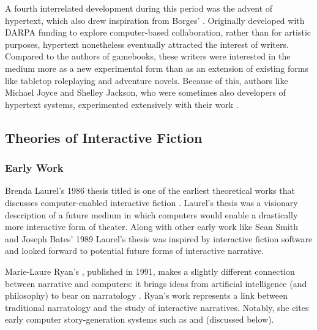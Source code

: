 A fourth interrelated development during this period was the advent of hypertext, which also drew inspiration from Borges' .
%
Originally developed with DARPA funding to explore computer-based collaboration, rather than for artistic purposes, hypertext nonetheless eventually attracted the interest of writers.
%
Compared to the authors of gamebooks, these writers were interested in the medium more as a new experimental form than as an extension of existing forms like tabletop roleplaying and adventure novels.
%
Because of this, authors like Michael Joyce and Shelley Jackson, who were sometimes also developers of hypertext systems, experimented extensively with their work \citep{Joyce1990, Jackson1995}.


\subsection{Theories of Interactive Fiction}

\subsubsection{Early Work}

Brenda Laurel's 1986 thesis titled  is one of the earliest theoretical works that discusses computer-enabled interactive fiction \citep{Laurel1986}.
%
Laurel's thesis was a visionary description of a future medium in which computers would enable a drastically more interactive form of theater.
%
Along with other early work like Sean Smith and Joseph Bates' 1989  \citep{Smith1989} Laurel's thesis was inspired by interactive fiction software and looked forward to potential future forms of interactive narrative.


Marie-Laure Ryan's , published in 1991, makes a slightly different connection between narrative and computers: it brings ideas from artificial intelligence (and philosophy) to bear on narratology \citep{Ryan1991}.
%
Ryan's work represents a link between traditional narratology and the study of interactive narratives.
%
Notably, she cites early computer story-generation systems such as  and  (discussed below).


